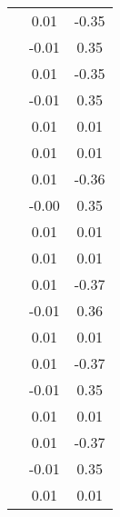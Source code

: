 \begin{table}
\begin{tabular}{c|cc|}
\multicolumn{1}{|c|}{} & \multicolumn{1}{|c|}{      0.01} & \multicolumn{1}{|c|}{     -0.35} \\ 
\multicolumn{1}{|c|}{} & \multicolumn{1}{|c|}{     -0.01} & \multicolumn{1}{|c|}{      0.35} \\ 
\multicolumn{1}{|c|}{} & \multicolumn{1}{|c|}{      0.01} & \multicolumn{1}{|c|}{     -0.35} \\ 
\multicolumn{1}{|c|}{} & \multicolumn{1}{|c|}{     -0.01} & \multicolumn{1}{|c|}{      0.35} \\ 
\multicolumn{1}{|c|}{} & \multicolumn{1}{|c|}{      0.01} & \multicolumn{1}{|c|}{      0.01} \\ 
\multicolumn{1}{|c|}{} & \multicolumn{1}{|c|}{      0.01} & \multicolumn{1}{|c|}{      0.01} \\ 
\multicolumn{1}{|c|}{} & \multicolumn{1}{|c|}{      0.01} & \multicolumn{1}{|c|}{     -0.36} \\ 
\multicolumn{1}{|c|}{} & \multicolumn{1}{|c|}{     -0.00} & \multicolumn{1}{|c|}{      0.35} \\ 
\multicolumn{1}{|c|}{} & \multicolumn{1}{|c|}{      0.01} & \multicolumn{1}{|c|}{      0.01} \\ 
\multicolumn{1}{|c|}{} & \multicolumn{1}{|c|}{      0.01} & \multicolumn{1}{|c|}{      0.01} \\ 
\multicolumn{1}{|c|}{} & \multicolumn{1}{|c|}{      0.01} & \multicolumn{1}{|c|}{     -0.37} \\ 
\multicolumn{1}{|c|}{} & \multicolumn{1}{|c|}{     -0.01} & \multicolumn{1}{|c|}{      0.36} \\ 
\multicolumn{1}{|c|}{} & \multicolumn{1}{|c|}{      0.01} & \multicolumn{1}{|c|}{      0.01} \\ 
\multicolumn{1}{|c|}{} & \multicolumn{1}{|c|}{      0.01} & \multicolumn{1}{|c|}{     -0.37} \\ 
\multicolumn{1}{|c|}{} & \multicolumn{1}{|c|}{     -0.01} & \multicolumn{1}{|c|}{      0.35} \\ 
\multicolumn{1}{|c|}{} & \multicolumn{1}{|c|}{      0.01} & \multicolumn{1}{|c|}{      0.01} \\ 
\multicolumn{1}{|c|}{} & \multicolumn{1}{|c|}{      0.01} & \multicolumn{1}{|c|}{     -0.37} \\ 
\multicolumn{1}{|c|}{} & \multicolumn{1}{|c|}{     -0.01} & \multicolumn{1}{|c|}{      0.35} \\ 
\multicolumn{1}{|c|}{} & \multicolumn{1}{|c|}{      0.01} & \multicolumn{1}{|c|}{      0.01} \\ 

\end{tabular}
\end{table}

